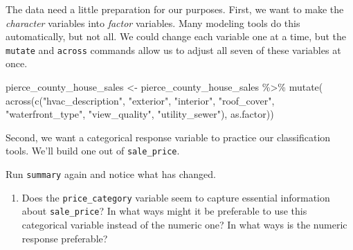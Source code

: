\documentclass[
]{article}
\newenvironment{Shaded}{\begin{snugshade}}{\end{snugshade}}
\newcommand{\AttributeTok}[1]{\textcolor[rgb]{0.77,0.63,0.00}{#1}}
\newcommand{\ConstantTok}[1]{\textcolor[rgb]{0.00,0.00,0.00}{#1}}
\newcommand{\DecValTok}[1]{\textcolor[rgb]{0.00,0.00,0.81}{#1}}
\newcommand{\FunctionTok}[1]{\textcolor[rgb]{0.00,0.00,0.00}{#1}}
\newcommand{\NormalTok}[1]{#1}
\newcommand{\OtherTok}[1]{\textcolor[rgb]{0.56,0.35,0.01}{#1}}
\newcommand{\SpecialCharTok}[1]{\textcolor[rgb]{0.00,0.00,0.00}{#1}}
\newcommand{\StringTok}[1]{\textcolor[rgb]{0.31,0.60,0.02}{#1}}
\providecommand{\tightlist}{%
  \setlength{\itemsep}{0pt}\setlength{\parskip}{0pt}}
\begin{document}
The data need a little preparation for our purposes. First, we want to
make the \emph{character} variables into \emph{factor} variables. Many
modeling tools do this automatically, but not all. We could change each
variable one at a time, but the \texttt{mutate} and \texttt{across}
commands allow us to adjust all seven of these variables at once.

\begin{Shaded}
\begin{Highlighting}[]
\NormalTok{pierce\_county\_house\_sales }\OtherTok{\textless{}{-}}\NormalTok{ pierce\_county\_house\_sales }\SpecialCharTok{\%\textgreater{}\%} \FunctionTok{mutate}\NormalTok{(}
  \FunctionTok{across}\NormalTok{(}\FunctionTok{c}\NormalTok{(}\StringTok{"hvac\_description"}\NormalTok{,  }\StringTok{"exterior"}\NormalTok{, }\StringTok{"interior"}\NormalTok{, }\StringTok{"roof\_cover"}\NormalTok{, }
           \StringTok{"waterfront\_type"}\NormalTok{, }\StringTok{"view\_quality"}\NormalTok{, }\StringTok{"utility\_sewer"}\NormalTok{), }
\NormalTok{         as.factor))}
\end{Highlighting}
\end{Shaded}

Second, we want a categorical response variable to practice our
classification tools. We'll build one out of \texttt{sale\_price}.

\begin{Shaded}
\end{Shaded}

Run \texttt{summary} again and notice what has changed.

\begin{enumerate}
\def\labelenumi{(\arabic{enumi})}
\tightlist
\item
  Does the \texttt{price\_category} variable seem to capture essential
  information about \texttt{sale\_price}? In what ways might it be
  preferable to use this categorical variable instead of the numeric
  one? In what ways is the numeric response preferable?
\end{enumerate}
\end{document}
